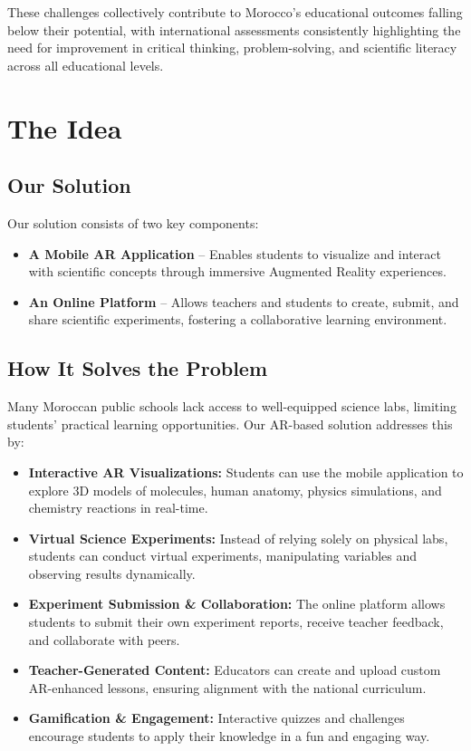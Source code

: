 \documentclass[11pt,                                          %
a4paper,                                       %
twoside]{report}                               %
\begin{document}
	These challenges collectively contribute to Morocco's educational outcomes falling below their potential, with international assessments consistently highlighting the need for improvement in critical thinking, problem-solving, and scientific literacy across all educational levels.
	
	
\chapter{The Idea}

\section{Our Solution}
Our solution consists of two key components:
\begin{itemize}
	\item \textbf{A Mobile AR Application} – Enables students to visualize and interact with scientific concepts through immersive Augmented Reality experiences.
	\item \textbf{An Online Platform} – Allows teachers and students to create, submit, and share scientific experiments, fostering a collaborative learning environment.
\end{itemize}

\section{How It Solves the Problem}
Many Moroccan public schools lack access to well-equipped science labs, limiting students’ practical learning opportunities. Our AR-based solution addresses this by:
\begin{itemize}
	\item \textbf{Interactive AR Visualizations:} Students can use the mobile application to explore 3D models of molecules, human anatomy, physics simulations, and chemistry reactions in real-time.
	\item \textbf{Virtual Science Experiments:} Instead of relying solely on physical labs, students can conduct virtual experiments, manipulating variables and observing results dynamically.
	\item \textbf{Experiment Submission \& Collaboration:} The online platform allows students to submit their own experiment reports, receive teacher feedback, and collaborate with peers.
	\item \textbf{Teacher-Generated Content:} Educators can create and upload custom AR-enhanced lessons, ensuring alignment with the national curriculum.
	\item \textbf{Gamification \& Engagement:} Interactive quizzes and challenges encourage students to apply their knowledge in a fun and engaging way.
\end{itemize}
\end{document}

